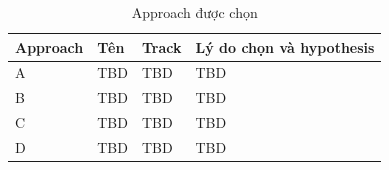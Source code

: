 \begin{table}[H]
  \centering
  \caption{Approach được chọn}
  \begin{tabularx}{\linewidth}{l l l X}
    \toprule
    \textbf{Approach} & \textbf{Tên} & \textbf{Track} & \textbf{Lý do chọn và hypothesis} \\
    \midrule
    A & TBD & TBD & TBD \\
    B & TBD & TBD & TBD \\
    C & TBD & TBD & TBD \\
    D & TBD & TBD & TBD \\
    \bottomrule
  \end{tabularx}
\end{table}
